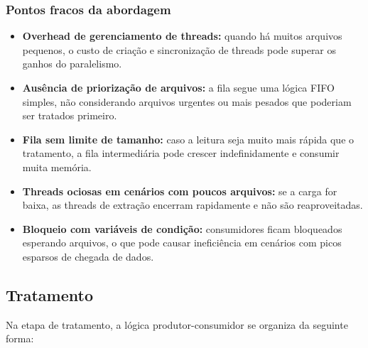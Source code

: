 \documentclass[a4paper,12pt]{article}
\begin{document}
\subsubsection*{Pontos fracos da abordagem}

\begin{itemize}
    \item \textbf{Overhead de gerenciamento de threads:} quando há muitos arquivos pequenos, o custo de criação e sincronização de threads pode superar os ganhos do paralelismo.

    \item \textbf{Ausência de priorização de arquivos:} a fila segue uma lógica FIFO simples, não considerando arquivos urgentes ou mais pesados que poderiam ser tratados primeiro.

    \item \textbf{Fila sem limite de tamanho:} caso a leitura seja muito mais rápida que o tratamento, a fila intermediária pode crescer indefinidamente e consumir muita memória.

    \item \textbf{Threads ociosas em cenários com poucos arquivos:} se a carga for baixa, as threads de extração encerram rapidamente e não são reaproveitadas.

    \item \textbf{Bloqueio com variáveis de condição:} consumidores ficam bloqueados esperando arquivos, o que pode causar ineficiência em cenários com picos esparsos de chegada de dados.

\end{itemize}

\subsection*{Tratamento}
Na etapa de tratamento, a lógica produtor-consumidor se organiza da seguinte forma:
\end{document}
